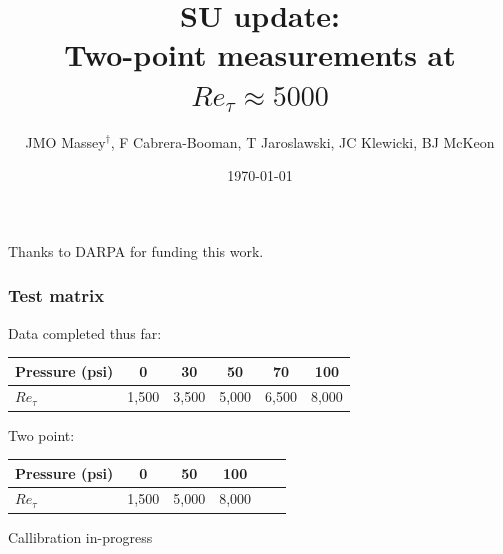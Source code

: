 \documentclass[aspectratio=169,9pt]{beamer}
\title{SU update: \\ Two-point measurements at $Re_\tau \approx 5000$}
\author{JMO Massey$^{\dag}$, F Cabrera-Booman, T Jaroslawski, JC Klewicki, BJ McKeon}
\institute{Center for Turbulence Research \\ Stanford University}
\date{\today}
\begin{document}
\begin{frame}
    \setcounter{framenumber}{0}
    \titlepage
    \vfill
    {\scriptsize \centering Thanks to DARPA for funding this work.\par}
\end{frame}

\begin{frame}
    \frametitle{Test matrix}
    Data completed thus far:
    \begin{table}[]
        \centering
        \begin{tabular}{lccccc}
        \toprule
        Pressure (psi) & 0 & 30 &  50 & 70&100 \\
        \midrule
        $Re_\tau$ & 1,500  &3,500& 5,000 &6,500& 8,000 \\
        \bottomrule
        \end{tabular}
    \end{table}

    Two point:
    \begin{table}[]
        \centering
        \begin{tabular}{lccccc}
        \toprule
        Pressure (psi) & 0  &  50 & 100 \\
        \midrule
        $Re_\tau$ & 1,500 & 5,000 & 8,000 \\
        \bottomrule
        \end{tabular}
    \end{table}

    \centering
    Callibration in-progress
\end{frame}
\end{document}

